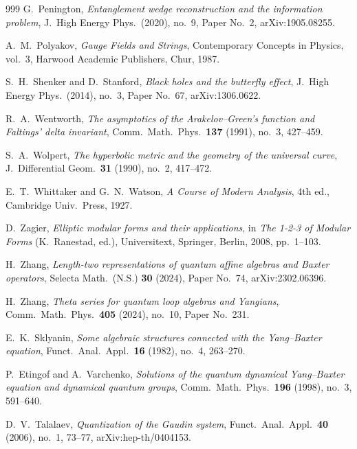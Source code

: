 \documentclass[11pt]{memoir}
\begin{document}
\begin{thebibliography}{999}
G.~Penington, \emph{Entanglement wedge reconstruction and the information problem}, J.\ High Energy Phys.\ (2020), no.~9, Paper No.~2, arXiv:1905.08255.

A.~M.~Polyakov, \emph{Gauge Fields and Strings}, Contemporary Concepts in Physics, vol.~3, Harwood Academic Publishers, Chur, 1987.

S.~H.~Shenker and D.~Stanford, \emph{Black holes and the butterfly effect}, J.\ High Energy Phys.\ (2014), no.~3, Paper No.~67, arXiv:1306.0622.

R.~A.~Wentworth, \emph{The asymptotics of the Arakelov--Green's function and Faltings' delta invariant}, Comm.\ Math.\ Phys.\ \textbf{137} (1991), no.~3, 427--459.

S.~A.~Wolpert, \emph{The hyperbolic metric and the geometry of the universal curve}, J.~Differential Geom.\ \textbf{31} (1990), no.~2, 417--472.

E.~T.~Whittaker and G.~N.~Watson, \emph{A Course of Modern Analysis}, 4th ed., Cambridge Univ.\ Press, 1927.

D.~Zagier, \emph{Elliptic modular forms and their applications}, in \emph{The 1-2-3 of Modular Forms} (K.~Ranestad, ed.), Universitext, Springer, Berlin, 2008, pp.~1--103.

H.~Zhang, \emph{Length-two representations of quantum affine algebras and Baxter operators}, Selecta Math.\ (N.S.) \textbf{30} (2024), Paper No.~74, arXiv:2302.06396.

H.~Zhang, \emph{Theta series for quantum loop algebras and Yangians}, Comm.\ Math.\ Phys.\ \textbf{405} (2024), no.~10, Paper No.~231.

E.~K.~Sklyanin, \emph{Some algebraic structures connected with the Yang--Baxter equation}, Funct.\ Anal.\ Appl.\ \textbf{16} (1982), no.~4, 263--270.

P.~Etingof and A.~Varchenko, \emph{Solutions of the quantum dynamical Yang--Baxter equation and dynamical quantum groups}, Comm.\ Math.\ Phys.\ \textbf{196} (1998), no.~3, 591--640.

D.~V.~Talalaev, \emph{Quantization of the Gaudin system}, Funct.\ Anal.\ Appl.\ \textbf{40} (2006), no.~1, 73--77, arXiv:hep-th/0404153.


\end{thebibliography}
\end{document}
